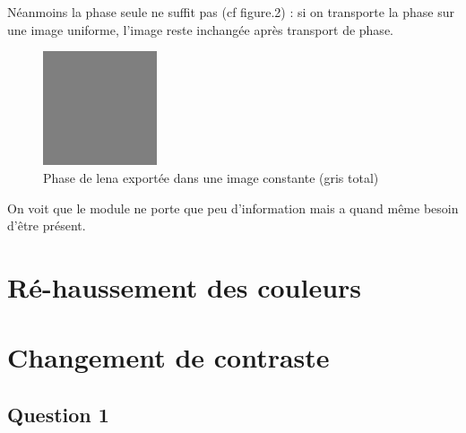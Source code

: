 \documentclass{article}
\begin{document}
Néanmoins la phase seule ne suffit pas (cf figure.2) : si on transporte la phase sur une image uniforme, l'image reste inchangée après transport de phase. 

\begin{figure}[h]

	\includegraphics[width=0.3\textwidth]{phase_swapping_in_grey_image.jpg}

  \caption{Phase de lena exportée dans une image constante (gris total)}
\end{figure}


On voit que le module ne porte que peu d'information mais a quand même besoin d'être présent. 


\section{Ré-haussement des couleurs}

\section{Changement de contraste}

\subsection*{Question 1}
\end{document}
